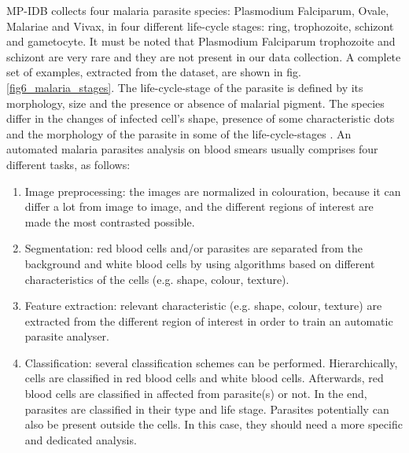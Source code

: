 \documentclass[final,a4paper,12pt,english]{UnicaPhdThesis3}
\begin{document}
	MP-IDB collects four malaria parasite species: Plasmodium Falciparum, Ovale, Malariae and Vivax, in four different life-cycle stages: ring, trophozoite, schizont and gametocyte. It must be noted that Plasmodium Falciparum trophozoite and schizont are very rare and they are not present in our data collection. A complete set of examples, extracted from the dataset, are shown in fig. \ref{fig6_malaria_stages}. The life-cycle-stage of the parasite is defined by its morphology, size and the presence or absence of malarial pigment. The species differ in the changes of infected cell’s shape, presence of some characteristic dots and the morphology of the parasite in some of the life-cycle-stages \cite{Somasekar2011}.
	An automated malaria parasites analysis on blood smears usually comprises four different tasks, as follows:
	\begin{enumerate}  
		\item Image preprocessing: the images are normalized in colouration, because it can differ a lot from image to image, and the different regions of interest are made the most contrasted possible. 
		\item Segmentation: red blood cells and/or parasites are separated from the background and white blood cells by using algorithms based on different characteristics of the cells (e.g. shape, colour, texture).
		\item Feature extraction: relevant characteristic (e.g. shape, colour, texture) are extracted from the different region of interest in order to train an automatic parasite analyser.
		\item Classification: several classification schemes can be performed. Hierarchically, cells are classified in red blood cells and white blood cells. Afterwards, red blood cells are classified in affected from parasite(s) or not. In the end, parasites are classified in their type and life stage. Parasites potentially can also be present outside the cells. In this case, they should need a more specific and dedicated analysis.
	\end{enumerate}
	
\end{document}

